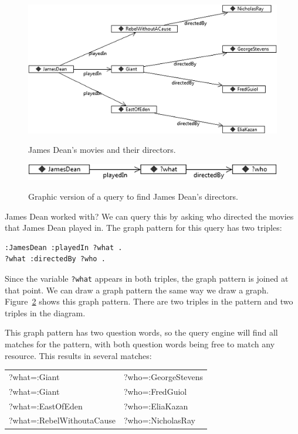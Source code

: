 \begin{figure}
\centering
\includegraphics[width=5in]{media/ch6/f06-02.png}
\label{fig:ch6.2}
\caption{James Dean's movies and their directors.}
\end{figure}

\begin{figure}
\centering
\includegraphics[width=5in]{media/ch6/f06-03.png}
\label{fig:ch6.3}
\caption{Graphic version of a query to find James Dean's directors.}
\end{figure}

James Dean worked with? We can query this by asking who directed the
movies that James Dean played in. The graph pattern for this query has
two triples:

\begin{lstlisting}
:JamesDean :playedIn ?what .
?what :directedBy ?who .
\end{lstlisting}

Since the variable \texttt{?what} appears in both triples, the graph pattern is
joined at that point. We can draw a graph pattern the same way we draw a
graph. Figure~\ref{fig:ch6.3} shows this graph pattern. There are two triples in the
pattern and two triples in the diagram.

This graph pattern has two question words, so the query engine will find
all matches for the pattern, with both question words being free to
match any resource. This results in several matches:

\begin{tabular}{ l l }
?what=:Giant&?who=:GeorgeStevens\\
?what=:Giant&?who=:FredGuiol \\
?what=:EastOfEden&?who=:EliaKazan \\
?what=:RebelWithoutaCause&?who=:NicholasRay \\
\end{tabular}

